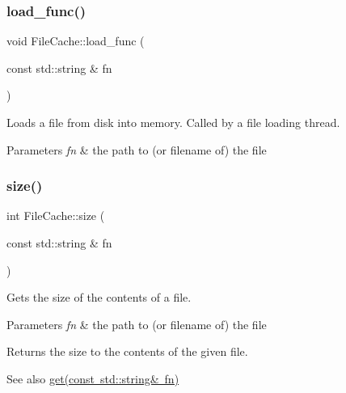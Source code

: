 \subsubsection{\texorpdfstring{load\_func()}{load\_func()}}
{\footnotesize\ttfamily void File\+Cache\+::load\+\_\+func (\begin{DoxyParamCaption}\item[{const std\+::string \&}]{fn }\end{DoxyParamCaption})\hspace{0.3cm}{\ttfamily [private]}}



Loads a file from disk into memory. Called by a file loading thread. 


\begin{DoxyParams}{Parameters}
{\em fn} & the path to (or filename of) the file \\
\hline
\end{DoxyParams}
\mbox{\label{classsage_1_1FileCache_a369b86f1fb585e5ce5142a7f1f22e38c}} 
\subsubsection{\texorpdfstring{size()}{size()}}
{\footnotesize\ttfamily int File\+Cache\+::size (\begin{DoxyParamCaption}\item[{const std\+::string \&}]{fn }\end{DoxyParamCaption})}



Gets the size of the contents of a file. 


\begin{DoxyParams}{Parameters}
{\em fn} & the path to (or filename of) the file \\
\hline
\end{DoxyParams}
\begin{DoxyReturn}{Returns}
the size to the contents of the given file. 
\end{DoxyReturn}
\begin{DoxySeeAlso}{See also}
\mbox{\hyperlink{classsage_1_1FileCache_a67fe1af6ccb8d06b7e97dc54a1836eee}{get(const std\+::string\& fn)}} 
\end{DoxySeeAlso}
\mbox{\label{classsage_1_1FileCache_a902a36451f11c4b6e4267358bfadb024}} 
